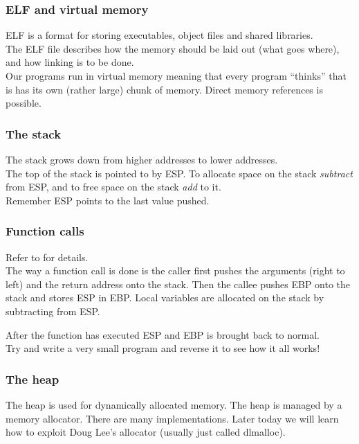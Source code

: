 \documentclass[slidestop,compress,mathserif, xcolor=table]{beamer}
\begin{document}
\begin{frame}
  \frametitle{ELF and virtual memory}

  ELF is a format for storing executables, object files and shared
  libraries.\\[1em]

  The ELF file describes how the memory should be laid out (what goes where),
  and how linking is to be done.\\[1em]

  Our programs run in virtual memory meaning that every program ``thinks'' that
  is has its own (rather large) chunk of memory. Direct memory references is possible.
\end{frame}

\begin{frame}
  \frametitle{The stack}

  The stack grows down from higher addresses to lower addresses.\\[1em]

  The top of the stack is pointed to by ESP. To allocate space on the stack
  \emph{subtract} from ESP, and to free space on the stack \emph{add} to
  it.\\[1em]

  Remember ESP points to the last value pushed.
\end{frame}

\begin{frame}
  \frametitle{Function calls}

  Refer to \cite{erickson2008} for details.\\[1em]

  The way a function call is done is the caller first pushes the arguments
  (right to left) and the return address onto the stack. Then the callee pushes
  EBP onto the stack and stores ESP in EBP. Local variables are allocated on the
  stack by subtracting from ESP.

  After the function has executed ESP and EBP is brought back to normal.\\[1em]

  Try and write a very small program and reverse it to see how it all works!
\end{frame}

\begin{frame}
  \frametitle{The heap}

  The heap is used for dynamically allocated memory. The heap is managed by a
  memory allocator. There are many implementations. Later today we will learn
  how to exploit Doug Lee's allocator (usually just called dlmalloc).
\end{frame}
\end{document}
